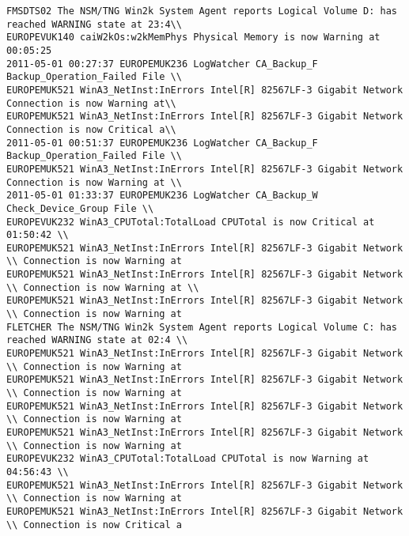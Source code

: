 \begin{lstlisting}
FMSDTS02 The NSM/TNG Win2k System Agent reports Logical Volume D: has reached WARNING state at 23:4\\
EUROPEVUK140 caiW2kOs:w2kMemPhys Physical Memory is now Warning at 00:05:25
2011-05-01 00:27:37 EUROPEMUK236 LogWatcher CA_Backup_F Backup_Operation_Failed File \\
EUROPEMUK521 WinA3_NetInst:InErrors Intel[R] 82567LF-3 Gigabit Network Connection is now Warning at\\
EUROPEMUK521 WinA3_NetInst:InErrors Intel[R] 82567LF-3 Gigabit Network Connection is now Critical a\\
2011-05-01 00:51:37 EUROPEMUK236 LogWatcher CA_Backup_F Backup_Operation_Failed File \\
EUROPEMUK521 WinA3_NetInst:InErrors Intel[R] 82567LF-3 Gigabit Network Connection is now Warning at \\
2011-05-01 01:33:37 EUROPEMUK236 LogWatcher CA_Backup_W Check_Device_Group File \\
EUROPEVUK232 WinA3_CPUTotal:TotalLoad CPUTotal is now Critical at 01:50:42 \\
EUROPEMUK521 WinA3_NetInst:InErrors Intel[R] 82567LF-3 Gigabit Network \\ Connection is now Warning at 
EUROPEMUK521 WinA3_NetInst:InErrors Intel[R] 82567LF-3 Gigabit Network \\ Connection is now Warning at \\
EUROPEMUK521 WinA3_NetInst:InErrors Intel[R] 82567LF-3 Gigabit Network \\ Connection is now Warning at 
FLETCHER The NSM/TNG Win2k System Agent reports Logical Volume C: has reached WARNING state at 02:4 \\
EUROPEMUK521 WinA3_NetInst:InErrors Intel[R] 82567LF-3 Gigabit Network \\ Connection is now Warning at
EUROPEMUK521 WinA3_NetInst:InErrors Intel[R] 82567LF-3 Gigabit Network \\ Connection is now Warning at
EUROPEMUK521 WinA3_NetInst:InErrors Intel[R] 82567LF-3 Gigabit Network \\ Connection is now Warning at
EUROPEMUK521 WinA3_NetInst:InErrors Intel[R] 82567LF-3 Gigabit Network \\ Connection is now Warning at
EUROPEVUK232 WinA3_CPUTotal:TotalLoad CPUTotal is now Warning at 04:56:43 \\ 
EUROPEMUK521 WinA3_NetInst:InErrors Intel[R] 82567LF-3 Gigabit Network \\ Connection is now Warning at
EUROPEMUK521 WinA3_NetInst:InErrors Intel[R] 82567LF-3 Gigabit Network \\ Connection is now Critical a

\end{lstlisting}
